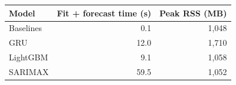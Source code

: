 \begin{tabular}{l rr}
\toprule
Model & Fit + forecast time (s) & Peak RSS (MB) \\
\midrule
Baselines & 0.1 & 1,048 \\
GRU & 12.0 & 1,710 \\
LightGBM & 9.1 & 1,058 \\
SARIMAX & 59.5 & 1,052 \\
\bottomrule
\end{tabular}
